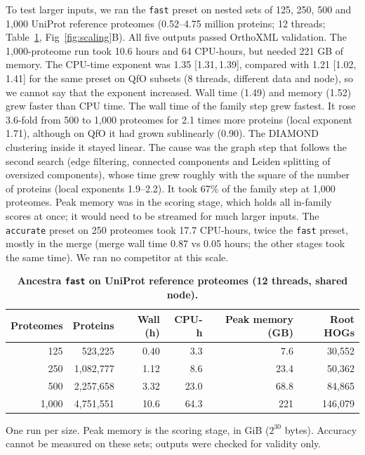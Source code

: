 \documentclass[10pt,letterpaper]{article}
\newcommand{\CI}[2]{[#1,\,#2]}
\begin{document}
To test larger inputs, we ran the \texttt{fast} preset on nested sets of 125, 250, 500 and 1,000 UniProt reference proteomes (0.52--4.75 million proteins; 12 threads; Table~\ref{tab:large}, Fig~\ref{fig:scaling}B). All five outputs passed OrthoXML validation. The 1,000-proteome run took 10.6 hours and 64 CPU-hours, but needed 221 GB of memory. The CPU-time exponent was 1.35 \CI{1.31}{1.39}, compared with 1.21 \CI{1.02}{1.41} for the same preset on QfO subsets (8 threads, different data and node), so we cannot say that the exponent increased. Wall time (1.49) and memory (1.52) grew faster than CPU time. The wall time of the family step grew fastest. It rose 3.6-fold from 500 to 1,000 proteomes for 2.1 times more proteins (local exponent 1.71), although on QfO it had grown sublinearly (0.90). The DIAMOND clustering inside it stayed linear. The cause was the graph step that follows the second search (edge filtering, connected components and Leiden splitting of oversized components), whose time grew roughly with the square of the number of proteins (local exponents 1.9--2.2). It took 67\% of the family step at 1,000 proteomes. Peak memory was in the scoring stage, which holds all in-family scores at once; it would need to be streamed for much larger inputs. The \texttt{accurate} preset on 250 proteomes took 17.7 CPU-hours, twice the \texttt{fast} preset, mostly in the merge (merge wall time 0.87 vs 0.05 hours; the other stages took the same time). We ran no competitor at this scale.

\begin{table}[!ht]
\centering
\caption{{\bf Ancestra \texttt{fast} on UniProt reference proteomes (12 threads, shared node).}}
\begin{tabular}{rrrrrr}
\hline
Proteomes & Proteins & Wall (h) & CPU-h & Peak memory (GB) & Root HOGs\\
\hline
125 & 523,225 & 0.40 & 3.3 & 7.6 & 30,552\\
250 & 1,082,777 & 1.12 & 8.6 & 23.4 & 50,362\\
500 & 2,257,658 & 3.32 & 23.0 & 68.8 & 84,865\\
1,000 & 4,751,551 & 10.6 & 64.3 & 221 & 146,079\\
\hline
\end{tabular}
\begin{flushleft}One run per size. Peak memory is the scoring stage, in GiB ($2^{30}$ bytes). Accuracy cannot be measured on these sets; outputs were checked for validity only.
\end{flushleft}
\label{tab:large}
\end{table}
\end{document}
